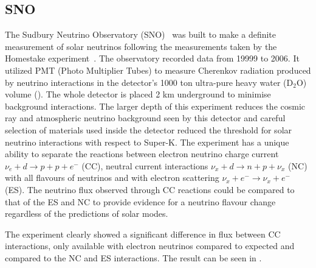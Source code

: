
\subsection{SNO}

The Sudbury Neutrino Observatory (SNO)~\cite{Fix6} was built to make a definite measurement of solar neutrinos following the measurements taken by the Homestake experiment~\cite{9Davis}. The observatory recorded data from 19999 to 2006. It utilized PMT (Photo Multiplier Tubes) to measure Cherenkov radiation produced by neutrino interactions in the detector's 1000 ton ultra-pure heavy water (D$_2$O) volume (). The whole detector is placed 2 km underground to minimise background interactions. The larger depth of this experiment reduces the cosmic ray and atmospheric neutrino background seen by this detector and careful selection of materials used inside the detector reduced the threshold for solar neutrino interactions with respect to Super-K. The experiment has a unique ability to separate the reactions between electron neutrino charge current $\nu_e + d \rightarrow p + p + e^-$ (CC), neutral current interactions $\nu_x + d \rightarrow n + p + \nu_x$ (NC) with all flavours of neutrinos and with electron scattering $\nu_x + e^- \rightarrow \nu_x + e^-$ (ES). The neutrino flux observed through CC reactions could be compared to that of the ES  and NC to provide evidence for a neutrino flavour change regardless of the predictions of solar modes.

The experiment clearly showed a significant difference in flux between CC interactions, only available with electron neutrinos compared to expected and compared to the NC and ES interactions. The result can be seen in .

